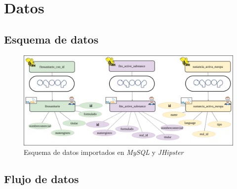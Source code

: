 \chapter{Datos} \label{a.datos}

\section{Esquema de datos} \label{a.datos.modelo}



\begin{landscape}

\begin{figure}[p!]
    
    \includegraphics[width=\linewidth]{Imagenes/datosmysql}
    \caption{Esquema de datos importados en \textit{MySQL} y \textit{JHipster}}
    \label{fig:datosmysql}
\end{figure}

\end{landscape}

\section{Flujo de datos} \label{a.datos.flujo}



\par